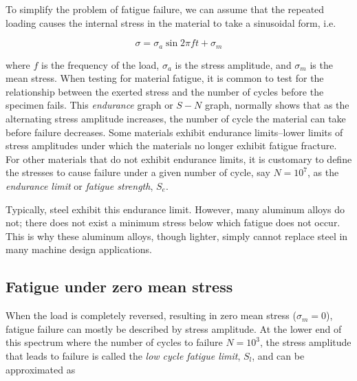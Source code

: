 \documentclass[a4paper,openany,12pt]{book}
\begin{document}
To simplify the problem of fatigue failure, we can assume that the
repeated loading causes the internal stress in the material to take a
sinusoidal form, i.e.


$$\sigma  = \sigma _a\sin 2\pi ft + \sigma _m$$

where \(f\) is the frequency of the load, \(\sigma_a\) is the stress
amplitude, and \(\sigma_m\) is the mean stress. When testing for material
fatigue, it is common to test for the relationship between the exerted
stress and the number of cycles before the specimen fails. This
\emph{endurance} graph or \(S-N\) graph, normally shows that as the alternating
stress amplitude increases, the number of cycle the material can take
before failure decreases. Some materials exhibit endurance limits--lower
limits of stress amplitudes under which the materials no longer exhibit
fatigue fracture. For other materials that do not exhibit endurance
limits, it is customary to define the stresses to cause failure under a
given number of cycle, say \(N = 10^7\), as the \emph{endurance limit} or
\emph{fatigue strength}, \(S_e\).


Typically, steel exhibit this endurance limit. However, many aluminum
alloys do not; there does not exist a minimum stress below which fatigue
does not occur. This is why these aluminum alloys, though lighter,
simply cannot replace steel in many machine design applications.

\subsection{Fatigue under zero mean stress}
\label{fatigue-under-zero-mean-stress}
When the load is completely reversed, resulting in zero mean stress
(\(\sigma_m = 0\)), fatigue failure can mostly be described by stress
amplitude. At the lower end of this spectrum where the number of cycles
to failure \(N = 10^3\), the stress amplitude that leads to failure is
called the \emph{low cycle fatigue limit}, \(S_l\), and can be approximated as
\end{document}
